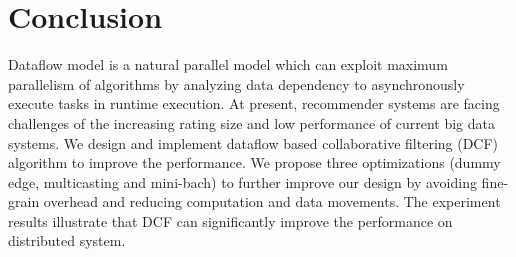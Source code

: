 \documentclass{llncs}
\begin{document}
\section{Conclusion}
\label{sec:conclusion}
\vspace{-5pt}
Dataflow model is a natural parallel model which can exploit maximum
parallelism of algorithms by analyzing data dependency to asynchronously
execute tasks in runtime execution. At present, recommender
systems are facing challenges of the increasing rating size and low performance of current big data systems. We design and implement dataflow based collaborative filtering (DCF) algorithm to improve the performance. We propose three optimizations (dummy edge, multicasting and mini-bach) to further improve our design by avoiding fine-grain overhead and reducing computation and data movements. The experiment results illustrate that DCF can significantly improve the performance on distributed system.

\vspace{-10pt}


\vspace{-20pt}
\end{document}
